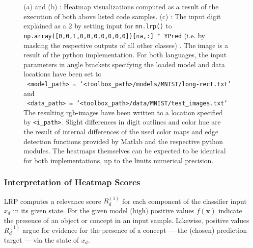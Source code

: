 \documentclass[a4wide]{article}
\newcommand{\x}{\boldsymbol{x}}
\begin{document}
\begin{figure}[h]
\centering
{}
\hspace{0.11\textwidth}
\hspace{0.11\textwidth}
\caption{(a) and (b) : Heatmap visualizations computed as a result of the execution of both above listed code samples. (c) : The input digit explained as a $2$ by setting input for \texttt{nn.lrp()} to \texttt{np.array([0,0,1,0,0,0,0,0,0,0])[na,:] $\ast$ YPred} (i.e. by masking the respective outputs of all other classes) . The image is a result of the python implementation.  For both languages, the input parameters in angle brackets specifying the loaded model and data locations have been set to\\
\texttt{ <model\_path> = '<toolbox\_path>/models/MNIST/long-rect.txt'} and\\
\texttt{ <data\_path> =  '<toolbox\_path>/data/MNIST/test\_images.txt'}\\
The resulting rgb-images have been written to a location specified by \texttt{<i\_path>}.
Slight differences in digit outlines and color hue are the result of internal differences of the used color maps and edge detection functions provided by Matlab and the respective python modules. The heatmaps themselves can be expected to be identical for both implementations, up to the limits numerical precision.}
\label{fig:example}
\end{figure}

\subsubsection*{Interpretation of Heatmap Scores}
LRP computes a relevance score $R_d^{(1)}$ for each component of the classifier input $x_d$ in its given state. For the given model (high) positive values $f(\x)$ indicate the presence of an object or concept in an input sample.
Likewise, positive values $R_d^{(1)}$ argue for evidence for the presence of a concept --- the (chosen) prediction target --- via the state of $x_d$.
\end{document}

